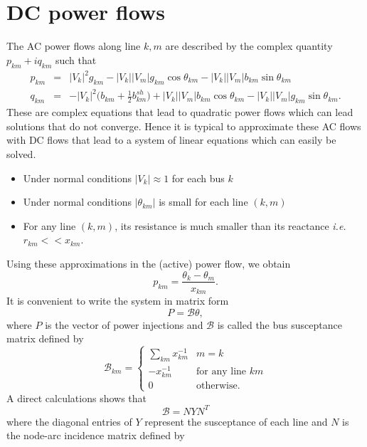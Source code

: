 \documentclass{article}
\newcommand{\ie}{\textit{i.e. }}
\begin{document}
\section{DC power flows}

The AC power flows along line ${k,m}$ are described by the complex quantity $p_{km}+iq_{km}$ such that
\begin{eqnarray}
p_{km} &=& |V_k|^2g_{km}-|V_k||V_m|g_{km}\cos \theta_{km}-|V_k||V_m|b_{km}\sin \theta_{km}\\
q_{km} &=& -|V_k|^2\big(b_{km}+\frac{1}{2}b_{km}^{sh} \big)+|V_k||V_m|b_{km}\cos \theta_{km}-|V_k||V_m|g_{km}\sin \theta_{km}.
\end{eqnarray}
These are complex equations that lead to quadratic power flows which can lead solutions that do not converge. Hence it is typical to approximate these AC flows with DC flows that lead to a system of linear equations which can easily be solved. 
\begin{itemize}
\item Under normal conditions $|V_k|\approx 1$ for each bus $k$
\item Under normal conditions $|\theta_{km}|$ is small for each line $(k,m)$
\item For any line $(k,m)$, its resistance is much smaller than its reactance \ie $r_{km}<<x_{km}$.
\end{itemize}
Using these approximations in the (active) power flow, we obtain
\begin{equation}
p_{km}=\frac{\theta_k-\theta_m}{x_{km}}.
\end{equation}
It is convenient to write the system in matrix form
\begin{equation}
P=\mathcal{B}\theta,
\end{equation}
where $P$ is the vector of power injections and  $\mathcal{B}$ is called the bus susceptance matrix defined by
\begin{equation}
\mathcal{B}_{km} = \begin{cases}
\sum_{km} x_{km}^{-1} & m=k\\
-x_{km}^{-1} & \text{for any line } km\\
0 & \text{otherwise}.
\end{cases}
\end{equation}
A direct calculations shows that 
\begin{equation}
\mathcal{B} = NYN^T
\end{equation}
where the diagonal entries of $Y$ represent the susceptance of each line and $N$ is the node-arc incidence matrix defined by
\end{document}
